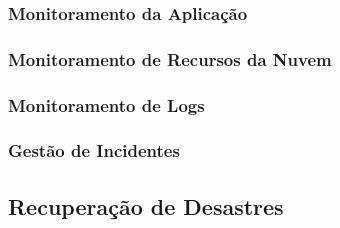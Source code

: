 \subsubsection{Monitoramento da Aplicação}

\subsubsection{Monitoramento de Recursos da Nuvem}

\subsubsection{Monitoramento de Logs}

\subsubsection{Gestão de Incidentes}

\subsection{Recuperação de Desastres}


